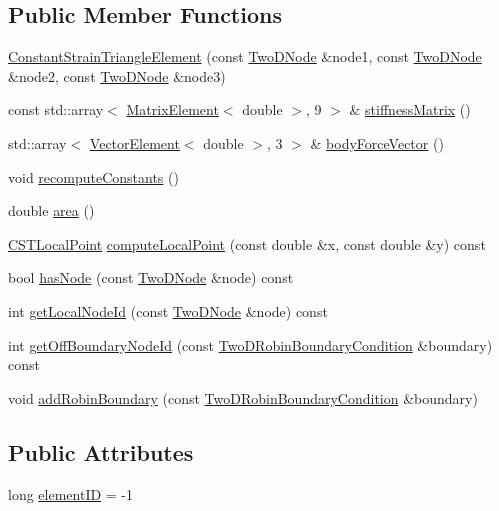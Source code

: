 \subsection*{Public Member Functions}
\begin{DoxyCompactItemize}
\item 
\hyperlink{a00773_aa54c09f1dd7cacaf1f4f0b1428859c00}{Constant\+Strain\+Triangle\+Element} (const \hyperlink{a00198_a92dafcc05a788e1065a5792b67f0f70e}{Two\+D\+Node} \&node1, const \hyperlink{a00198_a92dafcc05a788e1065a5792b67f0f70e}{Two\+D\+Node} \&node2, const \hyperlink{a00198_a92dafcc05a788e1065a5792b67f0f70e}{Two\+D\+Node} \&node3)
\item 
const std\+::array$<$ \hyperlink{a00198_a1a12603621e7a1efa59ac5cb79f9d509}{Matrix\+Element}$<$ double $>$, 9 $>$ \& \hyperlink{a00773_a6da0892a84128d73e1186aeb69a37723}{stiffness\+Matrix} ()
\item 
std\+::array$<$ \hyperlink{a00198_a08f01d4bb892cf7b2386d0f3a8643d72}{Vector\+Element}$<$ double $>$, 3 $>$ \& \hyperlink{a00773_ae0795172aa1ee5ffc68ec0e2c4aab9cc}{body\+Force\+Vector} ()
\item 
void \hyperlink{a00773_a40cf9432221b62db76e8b154e3e81e3d}{recompute\+Constants} ()
\item 
double \hyperlink{a00773_acd197716c6bffaa3c7b472661f0e5ca4}{area} ()
\item 
\hyperlink{a00198_a124b14f4255dab47a3f7235a02cc65ee}{C\+S\+T\+Local\+Point} \hyperlink{a00773_a772e106e996b0d757332ca59b9c7f159}{compute\+Local\+Point} (const double \&x, const double \&y) const
\item 
bool \hyperlink{a00773_acf4734f5fbc56b700c29d637baf78b9f}{has\+Node} (const \hyperlink{a00198_a92dafcc05a788e1065a5792b67f0f70e}{Two\+D\+Node} \&node) const
\item 
int \hyperlink{a00773_aaec00b05b8a6af567d2f5b39b1bb5611}{get\+Local\+Node\+Id} (const \hyperlink{a00198_a92dafcc05a788e1065a5792b67f0f70e}{Two\+D\+Node} \&node) const
\item 
int \hyperlink{a00773_a6f65ab76e065f67fd5cef71e2e8c9628}{get\+Off\+Boundary\+Node\+Id} (const \hyperlink{a00789}{Two\+D\+Robin\+Boundary\+Condition} \&boundary) const
\item 
void \hyperlink{a00773_a7f4a8e6d0fece8943963f615caf70f09}{add\+Robin\+Boundary} (const \hyperlink{a00789}{Two\+D\+Robin\+Boundary\+Condition} \&boundary)
\end{DoxyCompactItemize}
\subsection*{Public Attributes}
\begin{DoxyCompactItemize}
\item 
long \hyperlink{a00773_a5feb92c27270536c92fcb39c6fecc00d}{element\+ID} = -\/1
\end{DoxyCompactItemize}
